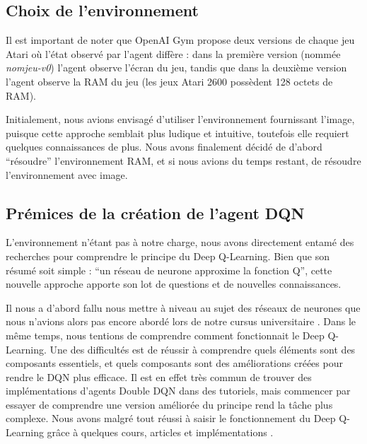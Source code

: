 \subsection{Choix de l'environnement}
Il est important de noter que OpenAI Gym propose deux versions de chaque jeu Atari où l'état observé par l'agent diffère : dans la première version (nommée \textit{nomjeu-v0}) l'agent observe l'écran du jeu, tandis que dans la deuxième version l'agent observe la RAM du jeu (les jeux Atari 2600 possèdent 128 octets de RAM).
\par
Initialement, nous avions envisagé d'utiliser l'environnement fournissant l'image, puisque cette approche semblait plus ludique et intuitive, toutefois elle requiert quelques connaissances de plus. Nous avons finalement décidé de d'abord ``résoudre'' l'environnement RAM, et si nous avions du temps restant, de résoudre l'environnement avec image.

\subsection{Prémices de la création de l'agent DQN}
L'environnement n'étant pas à notre charge, nous avons directement entamé des recherches pour comprendre le principe du Deep Q-Learning. Bien que son résumé soit simple : ``un réseau de neurone approxime la fonction Q'', cette nouvelle approche apporte son lot de questions et de nouvelles connaissances.
\par
Il nous a d'abord fallu nous mettre à niveau au sujet des réseaux de neurones que nous n'avions alors pas encore abordé lors de notre cursus universitaire \cite{dl_mit, 3b1b_nn, colah}. Dans le même temps, nous tentions de comprendre comment fonctionnait le Deep Q-Learning. Une des difficultés est de réussir à comprendre quels éléments sont des composants essentiels, et quels composants sont des améliorations créées pour rendre le DQN plus efficace. Il est en effet très commun de trouver des implémentations d'agents Double DQN dans des tutoriels, mais commencer par essayer de comprendre une version améliorée du principe rend la tâche plus complexe. Nous avons malgré tout réussi à saisir le fonctionnement du Deep Q-Learning grâce à quelques cours, articles et implémentations \cite{stanford_drl, atari_drl, keon}.

